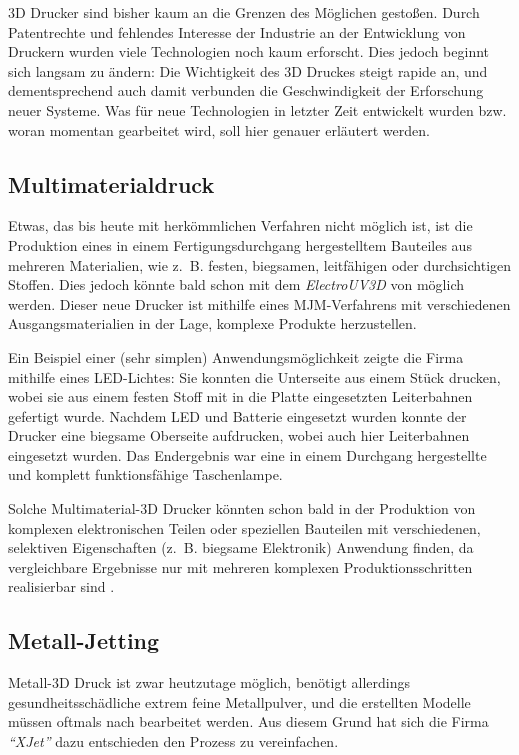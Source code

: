 3D Drucker sind bisher kaum an die Grenzen des Möglichen gestoßen. Durch Patentrechte und fehlendes Interesse der Industrie an der Entwicklung von Druckern wurden viele Technologien noch kaum erforscht. Dies jedoch beginnt sich langsam zu ändern: Die Wichtigkeit des 3D Druckes steigt rapide an, und dementsprechend auch damit verbunden die Geschwindigkeit der Erforschung neuer Systeme. Was für neue Technologien in letzter Zeit entwickelt wurden bzw. woran momentan gearbeitet wird, soll hier genauer erläutert werden.

\subsection{Multimaterialdruck}
Etwas, das bis heute mit herkömmlichen Verfahren nicht möglich ist, ist die Produktion eines in einem Fertigungsdurchgang hergestelltem Bauteiles aus mehreren Materialien, wie z.~B. festen, biegsamen, leitfähigen oder durchsichtigen Stoffen. Dies jedoch könnte bald schon mit dem \emph{ElectroUV3D} von  möglich werden. Dieser neue Drucker ist mithilfe eines MJM-Verfahrens mit verschiedenen Ausgangsmaterialien in der Lage, komplexe Produkte herzustellen. 

Ein Beispiel einer (sehr simplen) Anwendungsmöglichkeit zeigte die Firma mithilfe eines LED-Lichtes: Sie konnten die Unterseite aus einem Stück drucken, wobei sie aus einem festen Stoff mit in die Platte eingesetzten Leiterbahnen gefertigt wurde. Nachdem LED und Batterie eingesetzt wurden konnte der Drucker eine biegsame Oberseite aufdrucken, wobei auch hier Leiterbahnen eingesetzt wurden. Das Endergebnis war eine in einem Durchgang hergestellte und komplett funktionsfähige Taschenlampe.

Solche Multimaterial-3D Drucker könnten schon bald in der Produktion von komplexen elektronischen Teilen oder speziellen Bauteilen mit verschiedenen, selektiven Eigenschaften (z.~B. biegsame Elektronik) Anwendung finden, da vergleichbare Ergebnisse nur mit mehreren komplexen Produktionsschritten realisierbar sind \parencite{Multimaterial}.

\subsection{Metall-Jetting}
Metall-3D Druck ist zwar heutzutage möglich, benötigt allerdings gesundheitsschädliche extrem feine Metallpulver, und die erstellten Modelle müssen oftmals nach bearbeitet werden. Aus diesem Grund hat sich die Firma \emph{\textquotedblleft XJet\textquotedblright} dazu entschieden den Prozess zu vereinfachen. 

